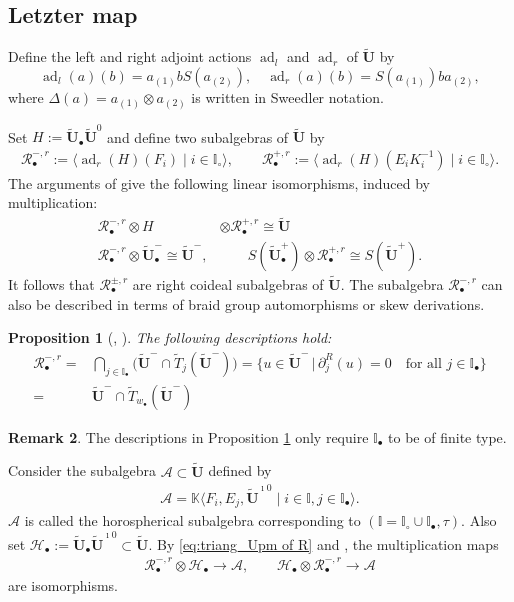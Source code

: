 \documentclass[a4paper,reqno,12pt]{amsart}
\numberwithin{equation}{section}
\newtheorem{proposition}{Proposition}[section]
\theoremstyle{definition}
\newtheorem{remark}[proposition]{Remark}
\theoremstyle{plain}
\theoremstyle{definition}
\def\K{\mathbb K}
\def\I{\mathbb I}
\def\bI{\I_\bullet}
\def\wI{\I_\circ}
\def\bw{w_\bullet}
\def\tU{\widetilde{\mathbf U}}
\def \tbU{\tU_{\bullet}}
\def\tTD{\widetilde T}
\def\cA{\mathcal A}
\def\cR{\mathcal R}
\def\cH{\mathcal H}
\newcommand{\ad}{\operatorname{ad}}
\begin{document}
\subsection{Letzter map}\label{sec:letzter map}
Define the left and right adjoint actions $\ad_l$ and $\ad_r$ of $\tU$ by
\begin{equation}\label{adjoint action}
    \ad_l(a)(b)=a_{(1)}bS(a_{(2)}),\quad \ad_r(a)(b)=S(a_{(1)})ba_{(2)},
\end{equation}
where $\Delta(a)=a_{(1)}\otimes a_{(2)}$ is written in Sweedler notation.

Set $H:=\tbU\tU^0$ and define two subalgebras of $\tU$ by
\begin{align}
    \cR_{\bullet}^{-,r}:=\langle\ad_r(H)(F_i)\mid i\in\wI\rangle,\qquad\cR_{\bullet}^{+,r}:=\langle \ad_r(H)(E_iK_i^{-1})\mid i\in\wI\rangle.
\end{align}
The arguments of \cite[\S 2.2]{KY26} give the following linear isomorphisms, induced by multiplication:
\begin{align}
    \label{eq:triang_U of R}
     \cR_\bullet^{-,r}\otimes H &\otimes \cR_\bullet^{+,r}\cong \tU \\
     \label{eq:triang_Upm of R}
    \cR_\bullet^{-,r}\otimes \tbU^-\cong \tU^-, &\qquad S(\tbU^+)\otimes \cR_\bullet^{+,r} \cong S(\tU^+).
\end{align}
It follows that $\cR_\bullet^{\pm,r}$ are right coideal subalgebras of $\tU$. The subalgebra $\cR_\bullet^{-,r}$ can also be described in terms of braid group
automorphisms or skew derivations.

\begin{proposition}[{\cite[Proposition 2.4, Lemma 2.5]{KY26}, \cite[Lemma 2.4]{KY21}}]\label{another description of R}
  The following descriptions hold:
  \begin{align}
      \cR_\bullet^{-,r}=&\bigcap_{j\in \I_\bullet} \big(\tU^-\cap \tTD_j(\tU^-)\big)=\{u\in \tU^-\,|\,\partial_j^R(u)=0\quad \mbox{for all $j\in \bI$}\}\label{R of derivation}\\
      =&\tU^-\cap \tTD_{\bw}(\tU^-) \label{R of T}
  \end{align}
\end{proposition}
\begin{remark}
 The descriptions in Proposition \ref{another description of R} only require $\bI$ to be of finite type.   
\end{remark}

Consider the subalgebra $\cA\subset \tU$ defined by
\begin{align*}
  \cA=\K\langle F_i, E_j, \tU^{\imath 0}\mid i\in \I, j\in \bI\rangle.
\end{align*}
$\cA$ is called the horospherical subalgebra corresponding to $(\I=\wI\cup\bI,\tau)$. Also set $\cH_\bullet:=\tbU\tU^{\imath 0}\subset \tU$.
By \eqref{eq:triang_Upm of R} and \cite[Theorem 2.1]{KY21}, the multiplication maps
\begin{align}\label{eq:A-triang-1}
    \cR_\bullet^{-,r}\otimes \cH_\bullet\longrightarrow \cA,\qquad \cH_\bullet\otimes \cR_\bullet^{-,r} \longrightarrow \cA
\end{align}
are isomorphisms. 
\end{document}
